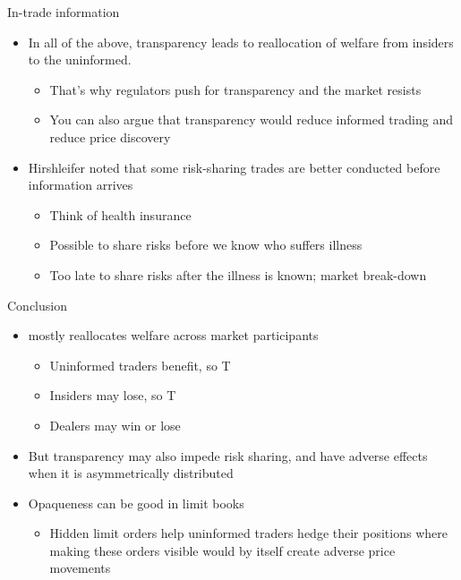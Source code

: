 \documentclass[english,10pt
,aspectratio=169
]{beamer}
\begin{document}
\begin{frame}{In-trade information}
	\begin{itemize}
		\item In all of the above, transparency leads to reallocation of welfare from insiders to the uninformed.
		\begin{itemize}
			\item That's why regulators push for transparency and the market resists
			\item You can also argue that transparency would reduce informed trading and reduce price discovery
		\end{itemize}
		\item Hirshleifer noted that some risk-sharing trades are better conducted before information arrives
		\begin{itemize}
			\item Think of health insurance
			\item Possible to share risks before we know who suffers illness
			\item Too late to share risks after the illness is known; market break-down
		\end{itemize}
	\end{itemize}
\end{frame}


\begin{frame}{Conclusion}
	\begin{itemize}
		\item {} mostly reallocates welfare across market participants 
		\begin{itemize}
			\item Uninformed traders benefit, so T 
			\item Insiders may lose, so T 
			\item Dealers may win or lose
		\end{itemize}
		\item But transparency may also impede risk sharing, and have adverse effects when it is asymmetrically distributed
		\item Opaqueness can be good in limit books
		\begin{itemize}
			\item Hidden limit orders help uninformed traders hedge their positions where making these orders visible would by itself create adverse price movements
		\end{itemize}
	\end{itemize}
\end{frame}
\end{document}
